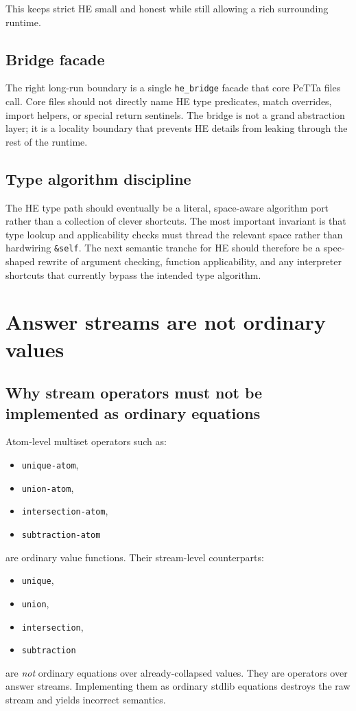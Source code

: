 \documentclass[11pt]{article}
\begin{document}
This keeps strict HE small and honest while still allowing a rich surrounding runtime.

\subsection{Bridge facade}

The right long-run boundary is a single \texttt{he\_bridge} facade that core PeTTa files call. Core files should not directly name HE type predicates, match overrides, import helpers, or special return sentinels. The bridge is not a grand abstraction layer; it is a locality boundary that prevents HE details from leaking through the rest of the runtime.

\subsection{Type algorithm discipline}

The HE type path should eventually be a literal, space-aware algorithm port rather than a collection of clever shortcuts. The most important invariant is that type lookup and applicability checks must thread the relevant space rather than hardwiring \texttt{\&self}. The next semantic tranche for HE should therefore be a spec-shaped rewrite of argument checking, function applicability, and any interpreter shortcuts that currently bypass the intended type algorithm.

\section{Answer streams are not ordinary values}

\subsection{Why stream operators must not be implemented as ordinary equations}

Atom-level multiset operators such as:
\begin{itemize}
    \item \texttt{unique-atom},
    \item \texttt{union-atom},
    \item \texttt{intersection-atom},
    \item \texttt{subtraction-atom}
\end{itemize}
are ordinary value functions. Their stream-level counterparts:
\begin{itemize}
    \item \texttt{unique},
    \item \texttt{union},
    \item \texttt{intersection},
    \item \texttt{subtraction}
\end{itemize}
are \emph{not} ordinary equations over already-collapsed values. They are operators over answer streams. Implementing them as ordinary stdlib equations destroys the raw stream and yields incorrect semantics.
\end{document}
